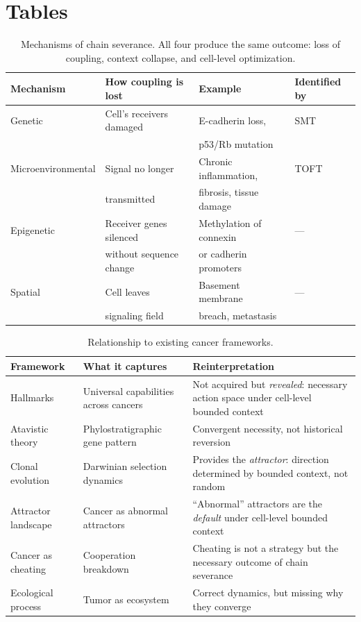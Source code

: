 \documentclass[11pt]{article}
\begin{document}
\section*{Tables}
\begin{landscape}

\begin{table}[p]
\centering
\caption{Mechanisms of chain severance. All four produce the same
outcome: loss of coupling, context collapse, and cell-level
optimization.}
\label{tab:severance-mechanisms}
\begin{tabular}{@{}llll@{}}
\toprule
Mechanism & How coupling is lost & Example & Identified by \\
\midrule
Genetic & Cell's receivers damaged & E-cadherin loss, & SMT \\
 & & p53/Rb mutation & \cite{Vogelstein2013} \\[4pt]
Microenvironmental & Signal no longer & Chronic inflammation, & TOFT \\
 & transmitted & fibrosis, tissue damage & \cite{Sonnenschein2000} \\[4pt]
Epigenetic & Receiver genes silenced & Methylation of connexin & --- \\
 & without sequence change & or cadherin promoters & \\[4pt]
Spatial & Cell leaves & Basement membrane & --- \\
 & signaling field & breach, metastasis & \\
\bottomrule
\end{tabular}
\end{table}

\begin{table}[p]
\centering
\caption{Relationship to existing cancer frameworks.}
\label{tab:prior-work}
\begin{tabular}{@{}>{\raggedright}p{3.5cm}>{\raggedright}p{6cm}>{\raggedright\arraybackslash}p{12cm}@{}}
\toprule
Framework & What it captures & Reinterpretation \\
\midrule
Hallmarks \cite{Hanahan2011}
 & Universal capabilities across cancers
 & Not acquired but \emph{revealed}: necessary action space under cell-level bounded context \\[4pt]
Atavistic theory \cite{Davies2011}
 & Phylostratigraphic gene pattern
 & Convergent necessity, not historical reversion \\[4pt]
Clonal evolution \cite{Nowell1976}
 & Darwinian selection dynamics
 & Provides the \emph{attractor}: direction determined by bounded context, not random \\[4pt]
Attractor landscape \cite{Huang2009}
 & Cancer as abnormal attractors
 & ``Abnormal'' attractors are the \emph{default} under cell-level bounded context \\[4pt]
Cancer as cheating \cite{Aktipis2015}
 & Cooperation breakdown
 & Cheating is not a strategy but the necessary outcome of chain severance \\[4pt]
Ecological process \cite{Merlo2006}
 & Tumor as ecosystem
 & Correct dynamics, but missing why they converge \\
\bottomrule
\end{tabular}
\end{table}


\end{landscape}
\end{document}
